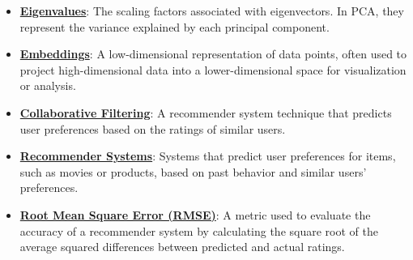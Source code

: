 \documentclass{article}%
\begin{document}
\begin{itemize}[leftmargin=*]
\item \href{https://purdue.brightspace.com/d2l/common/assets/pdfjs-d2l-dist/1.0.14-legacy/web/viewer.html?file=\%2Fcontent\%2Fenforced\%2F1095467-wl.202510.CS.24300.001\%2F11L2-svd-pca-recommender.pdf\%3Fou\%3D1095467\&lang=en-us\&container=d2l-fileviewer-rendered-pdf\&fullscreen=d2l-fileviewer-rendered-pdf-dialog\&height=667#page=17}{\textbf{Eigenvalues}}: The scaling factors associated with eigenvectors. In PCA, they represent the variance explained by each principal component.%
\item \href{https://purdue.brightspace.com/d2l/common/assets/pdfjs-d2l-dist/1.0.14-legacy/web/viewer.html?file=\%2Fcontent\%2Fenforced\%2F1095467-wl.202510.CS.24300.001\%2F11L2-svd-pca-recommender.pdf\%3Fou\%3D1095467\&lang=en-us\&container=d2l-fileviewer-rendered-pdf\&fullscreen=d2l-fileviewer-rendered-pdf-dialog\&height=667#page=5}{\textbf{Embeddings}}: A low-dimensional representation of data points, often used to project high-dimensional data into a lower-dimensional space for visualization or analysis.%
\item \href{https://purdue.brightspace.com/d2l/common/assets/pdfjs-d2l-dist/1.0.14-legacy/web/viewer.html?file=\%2Fcontent\%2Fenforced\%2F1095467-wl.202510.CS.24300.001\%2F11L2-svd-pca-recommender.pdf\%3Fou\%3D1095467\&lang=en-us\&container=d2l-fileviewer-rendered-pdf\&fullscreen=d2l-fileviewer-rendered-pdf-dialog\&height=667#page=33}{\textbf{Collaborative Filtering}}: A recommender system technique that predicts user preferences based on the ratings of similar users.%
\item \href{https://purdue.brightspace.com/d2l/common/assets/pdfjs-d2l-dist/1.0.14-legacy/web/viewer.html?file=\%2Fcontent\%2Fenforced\%2F1095467-wl.202510.CS.24300.001\%2F11L2-svd-pca-recommender.pdf\%3Fou\%3D1095467\&lang=en-us\&container=d2l-fileviewer-rendered-pdf\&fullscreen=d2l-fileviewer-rendered-pdf-dialog\&height=667#page=29}{\textbf{Recommender Systems}}: Systems that predict user preferences for items, such as movies or products, based on past behavior and similar users' preferences.%
\item \href{https://purdue.brightspace.com/d2l/common/assets/pdfjs-d2l-dist/1.0.14-legacy/web/viewer.html?file=\%2Fcontent\%2Fenforced\%2F1095467-wl.202510.CS.24300.001\%2F11L2-svd-pca-recommender.pdf\%3Fou\%3D1095467\&lang=en-us\&container=d2l-fileviewer-rendered-pdf\&fullscreen=d2l-fileviewer-rendered-pdf-dialog\&height=667#page=49}{\textbf{Root Mean Square Error (RMSE)}}: A metric used to evaluate the accuracy of a recommender system by calculating the square root of the average squared differences between predicted and actual ratings.%

\end{itemize}
\end{document}
